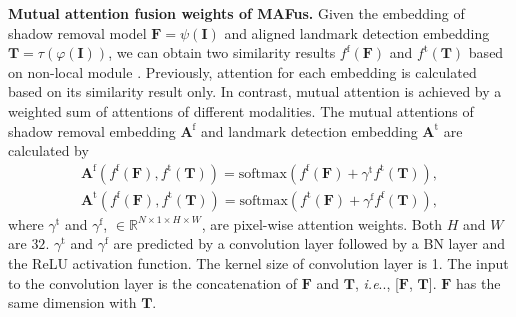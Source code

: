 \documentclass[10pt,twocolumn,letterpaper]{article}
\makeatletter
\DeclareRobustCommand\onedot{\futurelet\@let@token\@onedot}
\def\@onedot{\ifx\@let@token.\else.\null\fi\xspace}
\def\ie{\emph{i.e}\onedot} \def\Ie{\emph{I.e}\onedot}
\renewcommand{\paragraph}[1]{\vspace{1.25mm}\noindent\textbf{#1}}
\makeatother
\begin{document}
\paragraph{Mutual attention fusion weights of MAFus.} Given the embedding of shadow removal model $\mathbf{F}=\psi(\mathbf{I})$ and aligned landmark detection embedding $\mathbf{T}=\tau(\varphi(\mathbf{I}))$, we can obtain two similarity results $f^\text{f}(\mathbf{F})$ and $f^\text{t}(\mathbf{T})$ based on non-local module \cite{wang2018non}. Previously, attention for each embedding is calculated based on its similarity result only. In contrast, mutual attention is achieved by a weighted sum of attentions of different modalities. The mutual attentions of shadow removal embedding $\mathbf{A}^\text{f}$ and landmark detection embedding $\mathbf{A}^\text{t}$ are calculated by 
\begin{align}\label{eq:nonlocal-3-supp}
\mathbf{A}^\text{f}(f^\text{f}(\mathbf{F}),f^\text{t}(\mathbf{T}))=\text{softmax}(f^\text{f}(\mathbf{F})+\gamma^\text{t}f^\text{t}(\mathbf{T})),\\
\mathbf{A}^\text{t}(f^\text{f}(\mathbf{F}),f^\text{t}(\mathbf{T}))=\text{softmax}(f^\text{t}(\mathbf{F})+\gamma^\text{f}f^\text{f}(\mathbf{T})),
\end{align}
where $\gamma^\text{t}$ and $\gamma^\text{f}$, $\in \mathds{R}^{N\times 1\times H\times W}$, are pixel-wise attention weights. Both $H$ and $W$ are $32$. $\gamma^\text{t}$ and $\gamma^\text{f}$ are predicted by a convolution layer followed by a BN \cite{ioffe2015batch} layer and the ReLU activation function. The kernel size of convolution layer is 1. The input to the convolution layer is the concatenation of $\mathbf{F}$ and $\mathbf{T}$, \ie, [$\mathbf{F}$, $\mathbf{T}$]. $\mathbf{F}$ has the same dimension with $\mathbf{T}$.





\end{document}
